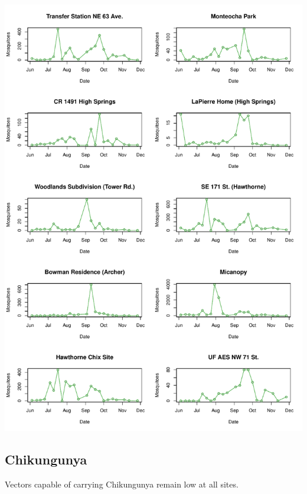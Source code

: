 \documentclass{article}
\begin{document}
\begin{center}
\includegraphics{mosq08nov13-010}
\newpage
\subsection*{Chikungunya}

\end{center}

Vectors capable of carrying Chikungunya remain low at all sites.\\
\end{document}
